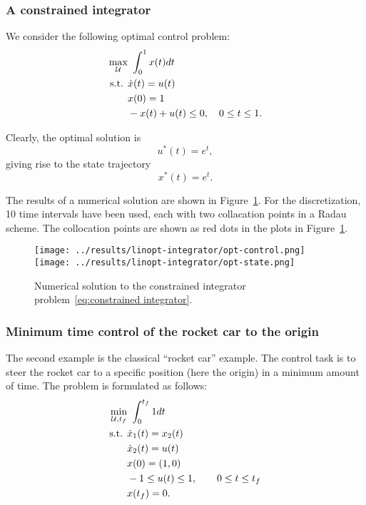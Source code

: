\documentclass[a4paper,11pt,DIV12]{scrartcl}
\theoremstyle{remark}
\begin{document}
\subsubsection{A constrained integrator}
\label{sec:constr-integr}

We consider the following optimal control problem:
\begin{equation}
  \label{eq:constrained integrator}
  \begin{aligned}
    \max_{\mathcal U} &\ \int_{0}^{1} x(t) dt \\
    \textnormal{s.t. } & \dot x(t) = u(t)\\
    & x(0) = 1 \\
    & - x(t) +  u(t) \leq 0, \quad 0 \leq t \leq 1.
  \end{aligned}
\end{equation}

Clearly, the optimal solution is
\begin{equation}
  u^\ast(t) = e^t,
\end{equation}
giving rise to the state trajectory
\begin{equation}
  x^\ast(t) = e^t.
\end{equation}

The results of a numerical solution are shown in Figure~\ref{fig:integrator}.
For the discretization, 10 time intervals have been used, each with two collacation points in a Radau scheme.
The collocation points are shown as red dots in the plots in Figure~\ref{fig:integrator}.

\begin{figure}
  \centering
  \texttt{[image: ../results/linopt-integrator/opt-control.png]}
  \hspace{1cm}
  \texttt{[image: ../results/linopt-integrator/opt-state.png]}
  \caption{Numerical solution to the constrained integrator problem~\eqref{eq:constrained integrator}.}
  \label{fig:integrator}
\end{figure}

\subsubsection{Minimum time control of the rocket car to the origin}
\label{sec:minimum-time-control}

The second example is the classical ``rocket car'' example.
The control task is to steer the rocket car to a specific position (here the origin) in a minimum amount of time.
The problem is formulated as follows:
\begin{equation}
  \label{eq:rocketcar}
  \begin{aligned}
    \min_{\mathcal U, t_f} &\ \int_{0}^{t_f} 1 dt \\
    \textnormal{s.t. } & \dot x_1(t) = x_2(t) \\
    & \dot x_2(t) = u(t) \\
    & x(0) = (1, 0) \\
    & -1 \leq u(t) \leq 1, \qquad 0 \leq t \leq t_f \\
    & x(t_f) = 0.
  \end{aligned}
\end{equation}
\end{document}
